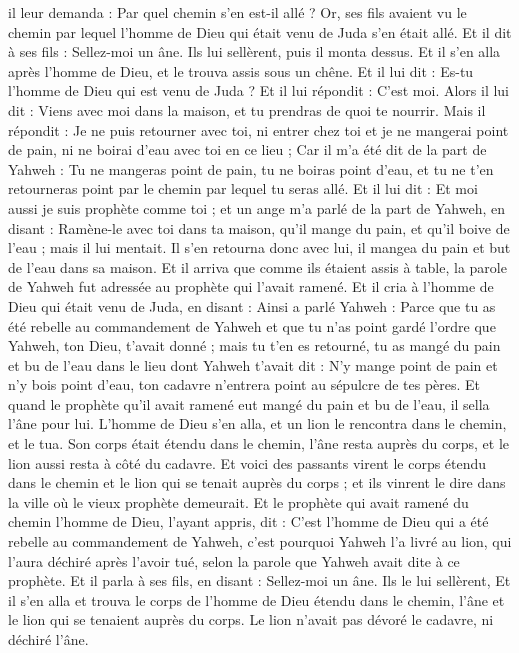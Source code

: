 \begin{multicols}{2}
il leur demanda : Par quel chemin s'en est-il allé ? Or, ses fils avaient vu le chemin par lequel l'homme de Dieu qui était venu de Juda s'en était allé.
Et il dit à ses fils : Sellez-moi un âne. Ils lui sellèrent, puis il monta dessus.
Et il s'en alla après l'homme de Dieu, et le trouva assis sous un chêne. Et il lui dit : Es-tu l'homme de Dieu qui est venu de Juda ? Et il lui répondit : C'est moi.
Alors il lui dit : Viens avec moi dans la maison, et tu prendras de quoi te nourrir.
Mais il répondit : Je ne puis retourner avec toi, ni entrer chez toi et je ne mangerai point de pain, ni ne boirai d'eau avec toi en ce lieu ;
Car il m'a été dit de la part de Yahweh : Tu ne mangeras point de pain, tu ne boiras point d'eau, et tu ne t'en retourneras point par le chemin par lequel tu seras allé.
Et il lui dit : Et moi aussi je suis prophète comme toi ; et un ange m'a parlé de la part de Yahweh, en disant : Ramène-le avec toi dans ta maison, qu'il mange du pain, et qu'il boive de l'eau ; mais il lui mentait.
Il s'en retourna donc avec lui, il mangea du pain et but de l'eau dans sa maison.
Et il arriva que comme ils étaient assis à table, la parole de Yahweh fut adressée au prophète qui l'avait ramené.
Et il cria à l'homme de Dieu qui était venu de Juda, en disant : Ainsi a parlé Yahweh : Parce que tu as été rebelle au commandement de Yahweh et que tu n'as point gardé l’ordre que Yahweh, ton Dieu, t'avait donné ;
mais tu t'en es retourné, tu as mangé du pain et bu de l'eau dans le lieu dont Yahweh t'avait dit : N'y mange point de pain et n'y bois point d'eau, ton cadavre n'entrera point au sépulcre de tes pères.
Et quand le prophète qu'il avait ramené eut mangé du pain et bu de l’eau, il sella l’âne pour lui.
L’homme de Dieu s'en alla, et un lion le rencontra dans le chemin, et le tua. Son corps était étendu dans le chemin, l'âne resta auprès du corps, et le lion aussi resta à côté du cadavre.
Et voici des passants virent le corps étendu dans le chemin et le lion qui se tenait auprès du corps ; et ils vinrent le dire dans la ville où le vieux prophète demeurait.
Et le prophète qui avait ramené du chemin l'homme de Dieu, l'ayant appris, dit : C'est l'homme de Dieu qui a été rebelle au commandement de Yahweh, c'est pourquoi Yahweh l'a livré au lion, qui l'aura déchiré après l'avoir tué, selon la parole que Yahweh avait dite à ce prophète.
Et il parla à ses fils, en disant : Sellez-moi un âne. Ils le lui sellèrent,
Et il s'en alla et trouva le corps de l'homme de Dieu étendu dans le chemin, l'âne et le lion qui se tenaient auprès du corps. Le lion n'avait pas dévoré le cadavre, ni déchiré l'âne.

\end{multicols}

